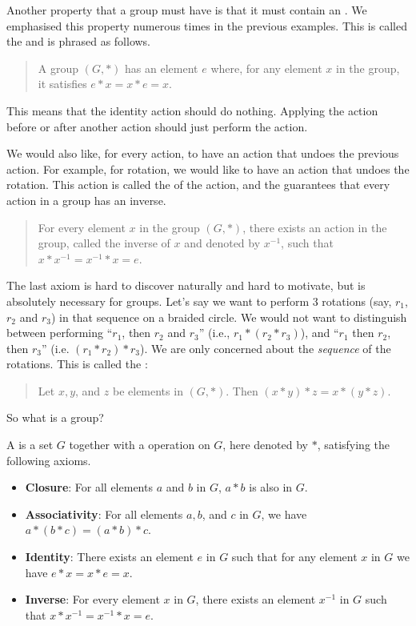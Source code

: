 Another property that a group must have is that it must contain an . We emphasised this property numerous times in the previous examples. This is called the  and is phrased as follows.
\begin{quote}
    A group $(G, \ast)$ has an element $e$ where, for any element $x$ in the group, it satisfies $e \ast x = x \ast e = x$.
\end{quote}
This means that the identity action should do nothing. Applying the action before or after another action should just perform the action.

We would also like, for every action, to have an action that undoes the previous action. For example, for rotation, we would like to have an action that undoes the rotation. This action is called the  of the action, and the  guarantees that every action in a group has an inverse.

\begin{quote}
    For every element $x$ in the group $(G, \ast)$, there exists an action in the group, called the inverse of $x$ and denoted by $x^{-1}$, such that $x \ast x^{-1} = x^{-1} \ast x = e$.
\end{quote}

The last axiom is hard to discover naturally and hard to motivate, but is absolutely necessary for groups. Let's say we want to perform 3 rotations (say, $r_1$, $r_2$ and $r_3$) in that sequence on a braided circle. We would not want to distinguish between performing ``$r_1$, then $r_2$ and $r_3$'' (i.e., $r_1 \ast (r_2 \ast r_3)$), and ``$r_1$ then $r_2$, then $r_3$'' (i.e. $(r_1 \ast r_2) \ast r_3$). We are only concerned about the \textit{sequence} of the rotations. This is called the :
\begin{quote}
    Let $x, y$, and $z$ be elements in $(G, \ast)$. Then $(x \ast y) \ast z = x \ast (y \ast z)$.
\end{quote}

\newpage

So what is a group?
\begin{definition}
    A  is a set $G$ together with a operation on $G$, here denoted by $\ast$, satisfying the following axioms.
    \begin{itemize}
        \item \textbf{Closure}: For all elements $a$ and $b$ in $G$, $a \ast b$ is also in $G$.
        \item \textbf{Associativity}: For all elements $a, b$, and $c$ in $G$, we have $a \ast (b \ast c) = (a \ast b) \ast c$.
        \item \textbf{Identity}: There exists an element $e$ in $G$ such that for any element $x$ in $G$ we have $e \ast x = x \ast e = x$.
        \item \textbf{Inverse}: For every element $x$ in $G$, there exists an element $x^{-1}$ in $G$ such that $x \ast x^{-1} = x^{-1} \ast x = e$.
    \end{itemize}
\end{definition}

